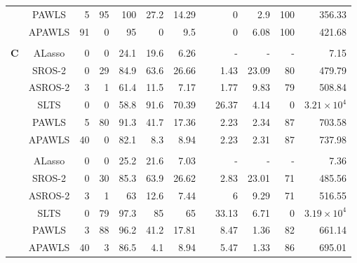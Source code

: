 \documentclass{article}\usepackage[]{graphicx}\usepackage[]{color}
\begin{document}
\begin{table}[thp]
\begin{center}
\begin{tabular}{ccrrrrrrrrrr}
	      & PAWLS & 5 & 95 & 100 
	      & 27.2 & 14.29 & & 0 
	      & 2.9 & 100 & 356.33\\
	      
	      & APAWLS & 91 & 0 & 95 
	      & 0 & 9.5 & & 0 
	      & 6.08 & 100 & 421.68\\
	      \\
	        	  \multirow{8}{*}{{\bf C}}
	       & ALasso & 0 & 0 & 24.1 
	      & 19.6 & 6.26 & & -& - & - &  7.15\\
	      
	       & SROS-2 & 0 & 29 & 84.9 
	      & 63.6 & 26.66 & & 1.43 
	      & 23.09 & 80 & 479.79\\
	      
	      & ASROS-2 & 3 & 1 & 61.4 
	      & 11.5 & 7.17 & & 1.77 
	      & 9.83 & 79 & 508.84\\
	      
	      
	       & SLTS & 0 & 0 & 58.8 
	      & 91.6 & 70.39 & & 26.37 
	      & 4.14 & 0 & \ensuremath{3.21\times 10^{4}}\\
	      
	      & PAWLS & 5 & 80 & 91.3 
	      & 41.7 & 17.36 & & 2.23 
	      & 2.34 & 87 & 703.58\\
	      
	      & APAWLS & 40 & 0 & 82.1 
	      & 8.3 & 8.94 & & 2.23 
	      & 2.31 & 87 & 737.98\\
	      
	     \\
	       	  \multirow{8}{*}{{\bf D}}
	      & ALasso & 0 & 0 & 25.2 
	      & 21.6 & 7.03 & & -& - & - &  7.36\\
	      
	       & SROS-2 & 0 & 30 & 85.3 
	      & 63.9 & 26.62 & & 2.83 
	      & 23.01 & 71 & 485.56\\
	      
	      & ASROS-2 & 3 & 1 & 63 
	      & 12.6 & 7.44 & & 6 
	      & 9.29 & 71 & 516.55\\
	      
	      
	       & SLTS & 0 & 79 & 97.3 
	      & 85 & 65 & & 33.13 
	      & 6.71 & 0 & \ensuremath{3.19\times 10^{4}}\\
	      
	      & PAWLS & 3 & 88 & 96.2 
	      & 41.2 & 17.81 & & 8.47 
	      & 1.36 & 82 & 661.14\\
	      
	      & APAWLS & 40 & 3 & 86.5 
	      & 4.1 & 8.94 & & 5.47 
	      & 1.33 & 86 & 695.01\\
	      

\end{tabular}
\end{center}
\end{table}
\end{document}

